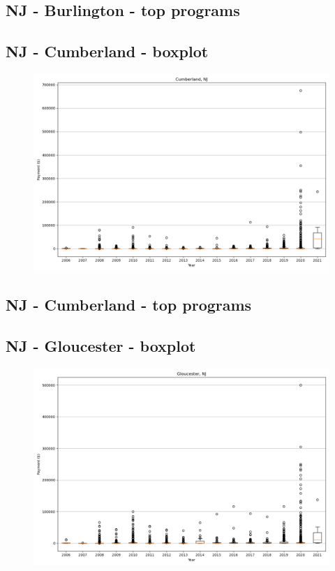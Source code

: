 \subsection*{NJ - Burlington - top programs}

\newpage
\subsection*{NJ - Cumberland - boxplot}
\begin{figure}[h]
\centering
\includegraphics[width=7in]{../output/boxplots/counties/Cumberland-NJ_boxplot.png}
\end{figure}


\subsection*{NJ - Cumberland - top programs}

\newpage
\subsection*{NJ - Gloucester - boxplot}
\begin{figure}[h]
\centering
\includegraphics[width=7in]{../output/boxplots/counties/Gloucester-NJ_boxplot.png}
\end{figure}


